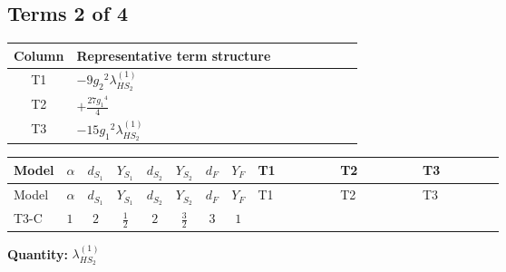 \documentclass[8pt]{article}
\begin{document}
\begin{landscape}
\subsection*{Terms 2 of 4}
\begin{center}
\begin{tabular}{@{}c >{\raggedright\arraybackslash}p{0.82\linewidth}@{}}
\toprule
Column & Representative term structure \\
\midrule
T1 & \(\displaystyle -9 {g_2}^2 {\lambda_{HS_2}^{(1)}}\) \\
\midrule
T2 & \(\displaystyle +\frac{27 {g_1}^4}{4}\) \\
\midrule
T3 & \(\displaystyle -15 {g_1}^2 {\lambda_{HS_2}^{(1)}}\) \\
\midrule
\bottomrule
\end{tabular}
\end{center}
\smallskip
\tiny
\begin{longtable}{@{}llcccccc >{\raggedright\arraybackslash}p{0.21\linewidth} >{\raggedright\arraybackslash}p{0.21\linewidth} >{\raggedright\arraybackslash}p{0.21\linewidth}@{}}
\toprule
Model & $\alpha$ & $d_{S_1}$ & $Y_{S_1}$ & $d_{S_2}$ & $Y_{S_2}$ & $d_F$ & $Y_F$ & T1 & T2 & T3 \\
\midrule
\endfirsthead
\toprule
Model & $\alpha$ & $d_{S_1}$ & $Y_{S_1}$ & $d_{S_2}$ & $Y_{S_2}$ & $d_F$ & $Y_F$ & T1 & T2 & T3 \\
\midrule
\endhead
T3-C & $1$ & $2$ & $\frac{1}{2}$ & $2$ & $\frac{3}{2}$ & $3$ & $1$ & \scriptsize\adjustbox{max width=\linewidth}{$\begin{gathered} -9 {g_2}^2 {\lambda_{HS_2}^{(1)}}\end{gathered}$} & \scriptsize\adjustbox{max width=\linewidth}{$\begin{gathered} +\frac{27 {g_1}^4}{4}\end{gathered}$} & \scriptsize\adjustbox{max width=\linewidth}{$\begin{gathered} -15 {g_1}^2 {\lambda_{HS_2}^{(1)}}\end{gathered}$} \\
\midrule
\bottomrule
\end{longtable}
\clearpage
\noindent\textbf{Quantity: }$\lambda_{HS_2}^{(1)}$\par\smallskip

\end{landscape}
\end{document}
